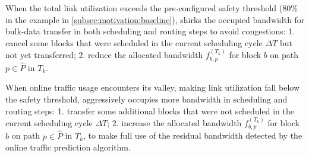 {\begin{packeditemize}
\item When the total link utilization exceeds the pre-configured safety threshold (80\% in the example in \Section\ref{subsec:motivation:baseline}), \name shirks the occupied bandwidth for bulk-data transfer in both scheduling and routing steps to avoid congestions: 1. cancel some blocks that were scheduled in the current scheduling cycle $\Delta T$ but not yet transferred; 2. reduce the allocated bandwidth $f_{b,p}^{(T_k)}$ for block $b$ on path $p\in \hat{P}$ in $T_k$.

\item When online traffic usage encounters its valley, making link utilization fall below the safety threshold, \name aggressively occupies more bandwidth in scheduling and routing steps: 1. transfer some additional blocks that were not scheduled in the current scheduling cycle $\Delta T$; 2. increase the allocated bandwidth $f_{b,p}^{(T_k)}$ for block $b$ on path $p\in \hat{P}$ in $T_k$, to make full use of the residual bandwidth detected by the online traffic prediction algorithm.
\end{packeditemize}





}
